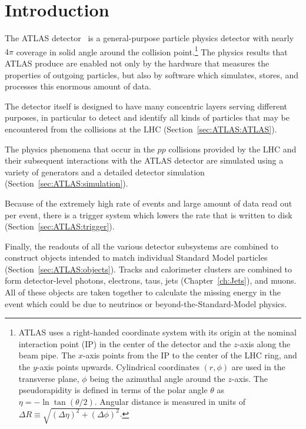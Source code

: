 \newcommand{\AtlasCoordFootnote}{
ATLAS uses a right-handed coordinate system with its origin at the nominal interaction point (IP)
in the center of the detector and the $z$-axis along the beam pipe.
The $x$-axis points from the IP to the center of the LHC ring,
and the $y$-axis points upwards.
Cylindrical coordinates $(r,\phi)$ are used in the transverse plane, 
$\phi$ being the azimuthal angle around the $z$-axis.
The pseudorapidity is defined in terms of the polar angle $\theta$ as $\eta = -\ln \tan(\theta/2)$.
Angular distance is measured in units of $\Delta R \equiv \sqrt{(\Delta\eta)^{2} + (\Delta\phi)^{2}}$.}

\section{Introduction}
The ATLAS detector~\cite{PERF-2007-01} is a general-purpose particle physics detector 
with nearly $4\pi$ coverage in solid angle around the collision point.\footnote{\AtlasCoordFootnote}
The physics results that ATLAS produce are enabled not only by the hardware that measures the properties of outgoing particles, but also by software which simulates, stores, and processes this enormous amount of data.

The detector itself is designed to have many concentric layers serving different purposes, in particular to detect and identify all kinds of particles that may be encountered from the collisions at the LHC (Section~\ref{sec:ATLAS:ATLAS}).

The physics phenomena that occur in the $pp$ collisions provided by the LHC and their subsequent interactions with the ATLAS detector are simulated using a variety of generators and a detailed detector simulation (Section~\ref{sec:ATLAS:simulation}).

Because of the extremely high rate of events and large amount of data read out per event, there is a trigger system which lowers the rate that is written to disk (Section~\ref{sec:ATLAS:trigger}).

Finally, the readouts of all the various detector subsystems are combined to construct objects intended to match individual Standard Model particles (Section~\ref{sec:ATLAS:objects}).
Tracks and calorimeter clusters are combined to form detector-level photons, electrons, taus, jets (Chapter~\ref{ch:Jets}), and muons.
All of these objects are taken together to calculate the missing energy in the event which could be due to neutrinos or beyond-the-Standard-Model physics.

